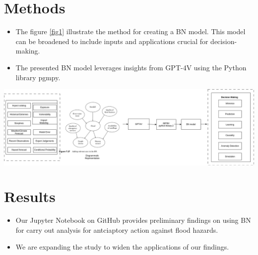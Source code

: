 \documentclass[a0paper,fleqn]{betterposter}
\begin{document}
{		
		\section{Methods}
		\begin{itemize}
			\item The figure \ref{fig1} illustrate the method for creating a BN model. This model can be broadened to include inputs and applications crucial for decision-making.
			\item The presented BN model leverages insights from GPT-4V using the Python library pgmpy.
		\end{itemize}
		\begin{center}
			\includegraphics[width=\textwidth]{img/BN-model-IBF-v2.png}
			\label{fig1}
		\end{center}
		
		
	    \section{Results}
		\begin{itemize}
			\item Our Jupyter Notebook on GitHub provides preliminary findings on using BN for carry out analysis for antciaptory action against flood hazards. 
			\item We are expanding the study to widen the applications of our findings.
		\end{itemize}
}
\end{document}
